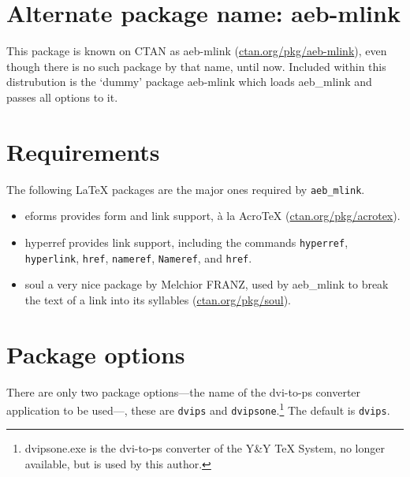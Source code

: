 \documentclass{article}
\makeatletter
\let\pkg\textsf
\let\opt\texttt
\let\app\textsf
\def\cs#1{\texttt{\@backslashchar#1}}
\makeatother
\begin{document}
\section{Alternate package name: \texorpdfstring{\protect\pkg{aeb-mlink}}{aeb-mlink}}

This package is known on CTAN as \pkg{aeb-mlink}
(\href{http://www.ctan.org/pkg/aeb-mlink}{ctan.org/pkg/aeb-mlink}), even
though there is no such package by that name, until now. Included within this distrubution
is the `dummy' package \pkg{aeb-mlink} which loads \pkg{aeb\_mlink} and passes all options
to it.

\section{Requirements}

The following {\LaTeX} packages are the major ones required by \texttt{aeb\_mlink}.
\begin{itemize}
    \item \pkg{eforms} provides form and link support, \`a la
        {Acro\negthinspace\TeX} (\href{http://www.ctan.org/pkg/acrotex}{ctan.org/pkg/acrotex}).
    \item \pkg{hyperref} provides link support, including the
        commands \cs{hyperref}, \cs{hyperlink}, \cs{href}, \cs{nameref},
        \cs{Nameref}, and \cs{href}.
    \item \pkg{soul} a very nice package by Melchior FRANZ, used by
        \pkg{aeb\_mlink} to break the text of a link into its syllables (\href{http://www.ctan.org/pkg/soul}{ctan.org/pkg/soul}).

\end{itemize}

\section{Package options}

There are only two package options---the name of the dvi-to-ps converter application to be used---,
these are \opt{dvips} and \opt{dvipsone}.\footnote{\app{dvipsone.exe} is the dvi-to-ps converter
of the Y\&Y {\TeX} System, no longer available, but is used by this author.} The default is \opt{dvips}.

\end{document}
